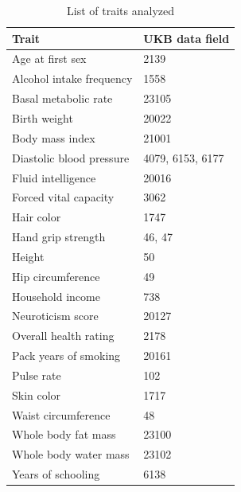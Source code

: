 \documentclass[hidelinks, 12pt]{article}
\begin{document}
\begin{table}[h!]
\caption{List of traits analyzed}
\begin{center}
 \begin{tabular}{| l l |} 
 \hline
 \textbf{Trait} & \textbf{UKB data field} \\ [0.5ex] 
 \hline\hline
  Age at first sex & 2139  \\ 
  Alcohol intake frequency & 1558  \\
  Basal metabolic rate & 23105  \\ 
  Birth weight & 20022  \\ 
  Body mass index & 21001  \\
  Diastolic blood pressure & 4079, 6153, 6177  \\ 
  Fluid intelligence & 20016  \\ 
  Forced vital capacity & 3062  \\ 
  Hair color & 1747  \\ 
  Hand grip strength & 46, 47  \\ 
  Height & 50  \\ 
  Hip circumference & 49  \\ 
  Household income & 738  \\ 
  Neuroticism score & 20127  \\ 
  Overall health rating & 2178  \\ 
  Pack years of smoking & 20161  \\ 
  Pulse rate & 102  \\ 
  Skin color & 1717  \\ 
  Waist circumference & 48  \\ 
  Whole body fat mass & 23100  \\ 
  Whole body water mass & 23102  \\ 
  Years of schooling & 6138 \\ 
   \hline
 \end{tabular}
\end{center}
\end{table}
\end{document}
